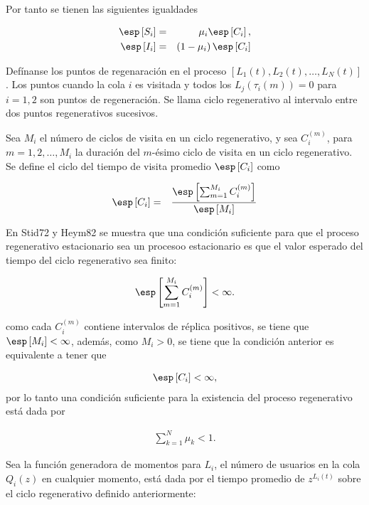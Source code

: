 Por tanto se tienen las siguientes igualdades


\begin{eqnarray*}
\esp\left[S_{i}\right]&=&\mu_{i}\esp\left[C_{i}\right],\\
\esp\left[I_{i}\right]&=&\left(1-\mu_{i}\right)\esp\left[C_{i}\right]\\
\end{eqnarray*}

Def\'inanse los puntos de regenaraci\'on  en el proceso $\left[L_{1}\left(t\right),L_{2}\left(t\right),\ldots,L_{N}\left(t\right)\right]$. Los puntos cuando la cola $i$ es visitada y todos los $L_{j}\left(\tau_{i}\left(m\right)\right)=0$ para $i=1,2$  son puntos de regeneraci\'on. Se llama ciclo regenerativo al intervalo entre dos puntos regenerativos sucesivos.

Sea $M_{i}$  el n\'umero de ciclos de visita en un ciclo regenerativo, y sea $C_{i}^{(m)}$, para $m=1,2,\ldots,M_{i}$ la duraci\'on del $m$-\'esimo ciclo de visita en un ciclo regenerativo. Se define el ciclo del tiempo de visita promedio $\esp\left[C_{i}\right]$ como

\begin{eqnarray*}
\esp\left[C_{i}\right]&=&\frac{\esp\left[\sum_{m=1}^{M_{i}}C_{i}^{(m)}\right]}{\esp\left[M_{i}\right]}
\end{eqnarray*}


En Stid72 y Heym82 se muestra que una condici\'on suficiente para que el proceso regenerativo 
estacionario sea un procesoo estacionario es que el valor esperado del tiempo del ciclo regenerativo sea finito:

\begin{eqnarray*}
\esp\left[\sum_{m=1}^{M_{i}}C_{i}^{(m)}\right]<\infty.
\end{eqnarray*}

como cada $C_{i}^{(m)}$ contiene intervalos de r\'eplica positivos, se tiene que $\esp\left[M_{i}\right]<\infty$, adem\'as, como $M_{i}>0$, se tiene que la condici\'on anterior es equivalente a tener que 

\begin{eqnarray*}
\esp\left[C_{i}\right]<\infty,
\end{eqnarray*}
por lo tanto una condici\'on suficiente para la existencia del proceso regenerativo est\'a dada por

\begin{eqnarray*}
\sum_{k=1}^{N}\mu_{k}<1.
\end{eqnarray*}

Sea la funci\'on generadora de momentos para $L_{i}$, el n\'umero de usuarios en la cola $Q_{i}\left(z\right)$ en cualquier momento, est\'a dada por el tiempo promedio de $z^{L_{i}\left(t\right)}$ sobre el ciclo regenerativo definido anteriormente:

